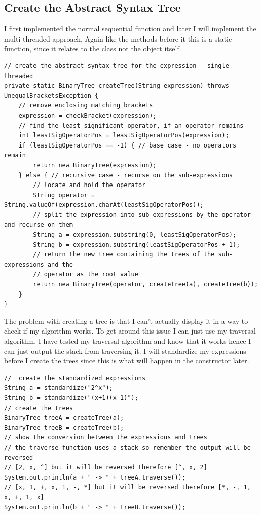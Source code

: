 \documentclass[../../../../../main.tex]{subfiles}
\begin{document}
\subsection{Create the Abstract Syntax Tree}
I first implemented the normal sequential function and later I will implement the multi-threaded approach. Again like the methods before it this is a static function, since it relates to the class not the object itself.
\begin{verbatim}
// create the abstract syntax tree for the expression - single-threaded
private static BinaryTree createTree(String expression) throws UnequalBracketsException {
	// remove enclosing matching brackets
	expression = checkBracket(expression);
	// find the least significant operator, if an operator remains
	int leastSigOperatorPos = leastSigOperatorPos(expression);
	if (leastSigOperatorPos == -1) { // base case - no operators remain
		return new BinaryTree(expression);
	} else { // recursive case - recurse on the sub-expressions
		// locate and hold the operator
		String operator = String.valueOf(expression.charAt(leastSigOperatorPos));
		// split the expression into sub-expressions by the operator and recurse on them
		String a = expression.substring(0, leastSigOperatorPos);
		String b = expression.substring(leastSigOperatorPos + 1);
		// return the new tree containing the trees of the sub-expressions and the
		// operator as the root value
		return new BinaryTree(operator, createTree(a), createTree(b));
	}
}
\end{verbatim}
The problem with creating a tree is that I can't actually display it in a way to check if my algorithm works. To get around this issue I can just use my traversal algorithm. I have tested my traversal algorithm and know that it works hence I can just output the stack from traversing it. I will standardize my expressions before I create the trees since this is what will happen in the constructor later.
\begin{verbatim}
//  create the standardized expressions
String a = standardize("2^x");
String b = standardize("(x+1)(x-1)");
// create the trees
BinaryTree treeA = createTree(a);
BinaryTree treeB = createTree(b);
// show the conversion between the expressions and trees
// the traverse function uses a stack so remember the output will be reversed
// [2, x, ^] but it will be reversed therefore [^, x, 2]
System.out.println(a + " -> " + treeA.traverse());
// [x, 1, +, x, 1, -, *] but it will be reversed therefore [*, -, 1, x, +, 1, x]
System.out.println(b + " -> " + treeB.traverse());
\end{verbatim}
\end{document}

